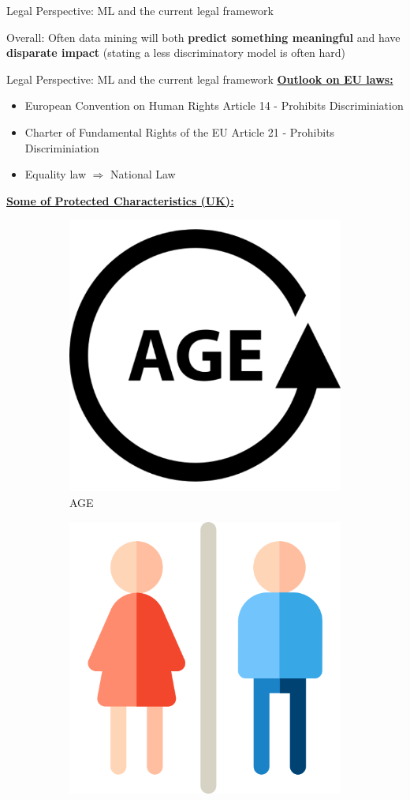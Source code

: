 {
\begin{frame}{Legal Perspective: ML and the current legal framework \cite{Barocas.2016}}
\vspace{2cm}
\begin{block}{\huge Overall:}
\LARGE Often data mining will both \textbf{predict something meaningful} and have \textbf{disparate impact} (stating a less discriminatory model is often hard)
\end{block}
\end{frame}
}

\begin{frame}{Legal Perspective: ML and the current legal framework \cite{Singh, automatedDsicrimination}}
    \underline{\textbf{Outlook on EU laws:}}\\
    \begin{itemize}
        \item European Convention on Human Rights Article 14 - Prohibits Discriminiation
        \item Charter of Fundamental Rights of the EU Article 21 - Prohibits Discriminiation
        \item Equality law $\Rightarrow$ National Law
    \end{itemize}
    \vspace{0.5cm}
    \underline{\textbf{Some of Protected Characteristics (UK):}}\\[0.75cm]
    \begin{figure}
        \centering
        \begin{subfigure}{.165\textwidth}
            \centering
            \includegraphics[width=.4\linewidth]{presentation/assets/age.png}
            \caption{AGE}
            \label{fig:sub1}
        \end{subfigure}%
        \begin{subfigure}{.165\textwidth}
            \centering
            \includegraphics[width=.4\linewidth]{presentation/assets/gender.png}

\end{subfigure}
\end{figure}
\end{frame}
